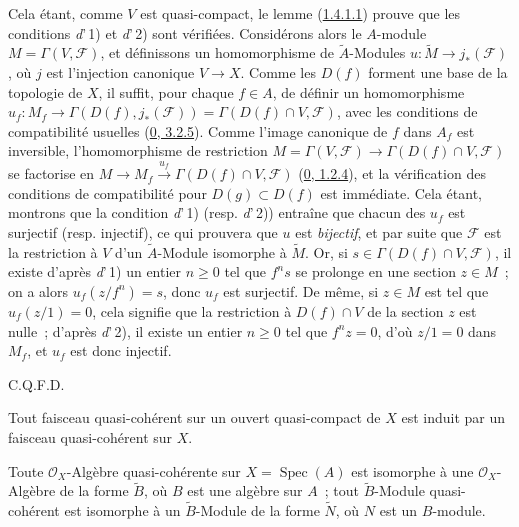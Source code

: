 Cela étant, comme $V$ est quasi-compact, le lemme
(\hyperref[I.1.4.1.1-fr]{1.4.1.1}) prouve que les conditions
\textit{d}'\,1) et \textit{d}'\,2) sont vérifiées. Considérons alors le
$A$-module $M=\Gamma(V,\mathscr{F})$, et définissons un homomorphisme de
$\widetilde{A}$-Modules $u:\widetilde{M}\to j_*(\mathscr{F})$, où $j$ est
l'injection canonique $V\to X$. Comme les $D(f)$ forment une base de la
topologie de $X$, il suffit, pour chaque $f\in A$, de définir un
homomorphisme
$u_f:M_f\to\Gamma(D(f),j_*(\mathscr{F}))=\Gamma(D(f)\cap V,\mathscr{F})$,
avec les conditions de compatibilité usuelles
(\hyperref[0.3.2.5-fr]{0, 3.2.5}). Comme l'image canonique de $f$ dans
$A_f$ est inversible, l'homomorphisme de restriction
$M=\Gamma(V,\mathscr{F})\to\Gamma(D(f)\cap V,\mathscr{F})$ se factorise en
$M\longrightarrow M_f\xrightarrow{u_f}\Gamma(D(f)\cap V,\mathscr{F})$
(\hyperref[0.1.2.4-fr]{0, 1.2.4}), et la vérification des conditions de
compatibilité pour $D(g)\subset D(f)$ est immédiate. Cela étant, montrons
que la condition \textit{d}'\,1) (resp. \textit{d}'\,2)) entraîne que chacun
des $u_f$ est surjectif (resp. injectif), ce qui prouvera que $u$ est
\emph{bijectif}, et par suite que $\mathscr{F}$ est la restriction à $V$
d'un $\widetilde{A}$-Module isomorphe à $\widetilde{M}$. Or, si
$s\in\Gamma(D(f)\cap V,\mathscr{F})$, il existe d'après \textit{d}'\,1) un
entier $n\geq0$ tel que $f^n s$ se prolonge en une section $z\in M$~; on a
alors $u_f(z/f^n)=s$, donc $u_f$ est surjectif. De même, si $z\in M$ est tel
que $u_f(z/1)=0$, cela signifie que la restriction à $D(f)\cap V$ de la
section $z$ est nulle~; d'après \textit{d}'\,2), il existe un entier
$n\geq0$ tel que $f^n z=0$, d'où $z/1=0$ dans $M_f$, et $u_f$ est donc
injectif.

\par\hfill C.Q.F.D.\par

\begin{corollary}[1.4.2]
\label{I.1.4.2-fr}
Tout faisceau quasi-cohérent sur un ouvert quasi-compact de $X$ est induit
par un faisceau quasi-cohérent sur $X$.
\end{corollary}

\begin{corollary}[1.4.3]
\label{I.1.4.3-fr}
Toute $\mathscr{O}_X$-Algèbre quasi-cohérente sur
$X=\operatorname{Spec}(A)$ est isomorphe à une $\mathscr{O}_X$-Algèbre de
la forme $\widetilde{B}$, où $B$ est une algèbre sur $A$~; tout
$\widetilde{B}$-Module quasi-cohérent est isomorphe à un
$\widetilde{B}$-Module de la forme $\widetilde{N}$, où $N$ est un
$B$-module.
\end{corollary}

